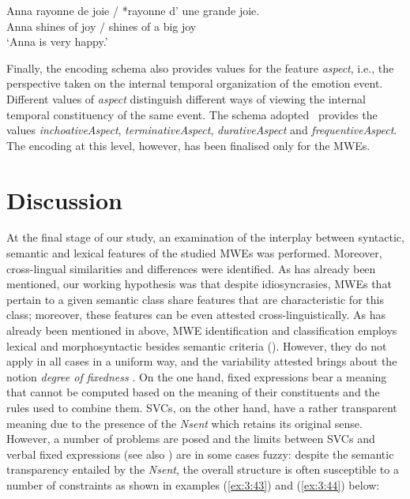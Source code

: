 \documentclass[output=paper]{langsci/langscibook}
\begin{document}
\begin{exe}
\ex \label{ex:3:42}
\gll Anna rayonne de joie / *rayonne d’  une grande joie. \\
Anna shines of joy / shines of a big joy\\
\glt ‘Anna is very happy.’
\end{exe}


Finally, the encoding schema also provides values for the feature
 \textit{aspect}, i.e., the perspective taken on the internal
temporal organization of the emotion event. Different values of
\textit{aspect} distinguish different ways of viewing the
internal temporal constituency of the same event. The schema adopted
\ provides the values \textit{inchoativeAspect},
\textit{terminativeAspect},
\textit{durativeAspect} and
\textit{frequentiveAspect}. The encoding at this level,
however, has been finalised only for the  MWEs.

\section{Discussion}


At the final stage of our study, an examination of the interplay between
syntactic, semantic and lexical features of the studied MWEs was
performed. Moreover,  cross-lingual similarities and differences were
identified. As has already been mentioned, our working hypothesis was
that despite idiosyncrasies, MWEs that pertain to a given semantic
class share features that are characteristic for this class; moreover,
these features can be even attested cross-linguistically. As has
already been mentioned in  above, MWE identification and
classification employs lexical and morphosyntactic besides semantic
criteria (\citealt{gross1982,Gross1998,lamiroy2003}). However, they do not apply in all cases in a
uniform way, and the variability attested brings about the notion 
\textit{degree of fixedness} \citep{gross1996}.  On the one hand,
fixed expressions bear a meaning that cannot be computed based on the
meaning of their constituents and the rules used to combine them. SVCs,
on the other hand, have a rather transparent meaning due to the
presence of the \textit{Nsent }which retains its original sense.
However, a number of problems are posed and the limits between SVCs and
verbal fixed expressions (see also  ) are in some cases
fuzzy: despite the semantic transparency entailed by the
\textit{Νsent}, the overall structure is often susceptible to a number
of constraints as shown in examples (\ref{ex:3:43}) and (\ref{ex:3:44}) below:
\end{document}
